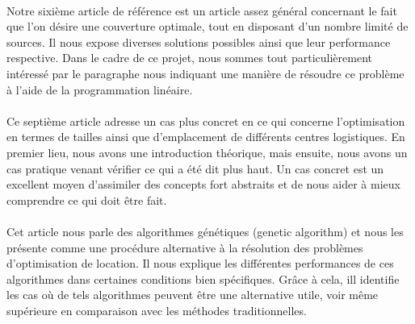 \paragraph{}
Notre sixième article de référence est un article assez général concernant le fait que l'on désire une couverture optimale, tout en disposant d'un nombre limité de sources. Il nous expose diverses solutions possibles ainsi que leur performance respective. Dans le cadre de ce projet, nous sommes tout particulièrement intéressé par le paragraphe nous indiquant une manière de résoudre ce problème à l'aide de la programmation linéaire.

\paragraph{}
Ce septième article adresse un cas plus concret en ce qui concerne l'optimisation en termes de tailles ainsi que d'emplacement de différents centres logistiques. En premier lieu, nous avons une introduction théorique, mais ensuite, nous avons un cas pratique venant vérifier ce qui a été dit plus haut. Un cas concret est un excellent moyen d'assimiler des concepts fort abstraits et de nous aider à mieux comprendre ce qui doit être fait.

\paragraph{}
Cet article nous parle des algorithmes génétiques (genetic algorithm) et nous les présente comme une procédure alternative à la résolution des problèmes d'optimisation de location. Il nous explique les différentes performances de ces algorithmes dans certaines conditions bien spécifiques. Grâce à cela, ill identifie les cas où de tels algorithmes peuvent être une alternative utile, voir même supérieure en comparaison avec les méthodes traditionnelles.